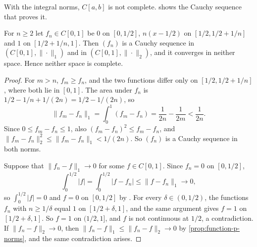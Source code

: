 With the integral norms, $C[a,b]$ is not complete.  shows the Cauchy sequence that proves it.

\begin{figure}
\end{figure}

\begin{proposition}
\label{prop:c-l1-incomplete}
For $n\ge2$ let $f_n\in C[0,1]$ be $0$ on $[0,1/2]$, $n(x-1/2)$ on $[1/2,1/2+1/n]$ and $1$ on $[1/2+1/n,1]$. Then $(f_n)$ is a Cauchy sequence in $(C[0,1],\|\cdot\|_1)$ and in $(C[0,1],\|\cdot\|_2)$, and it converges in neither space. Hence neither space is complete.
\end{proposition}

\begin{proof}
For $m>n$, $f_m\ge f_n$, and the two functions differ only on $[1/2,1/2+1/n]$, where both lie in $[0,1]$. The area under $f_n$ is $1/2-1/n+1/(2n)=1/2-1/(2n)$, so
\[
\|f_m-f_n\|_1=\int_0^1(f_m-f_n)=\frac1{2n}-\frac1{2m}<\frac1{2n} .
\]
Since $0\le f_m-f_n\le1$, also $(f_m-f_n)^2\le f_m-f_n$, and $\|f_m-f_n\|_2^2\le\|f_m-f_n\|_1<1/(2n)$. So $(f_n)$ is a Cauchy sequence in both norms.

Suppose that $\|f_n-f\|_1\to0$ for some $f\in C[0,1]$. Since $f_n=0$ on $[0,1/2]$,
\[
\int_0^{1/2}|f|=\int_0^{1/2}|f-f_n|\le\|f-f_n\|_1\to0 ,
\]
so $\int_0^{1/2}|f|=0$ and $f=0$ on $[0,1/2]$ by . For every $\delta\in(0,1/2)$, the functions $f_n$ with $n\ge1/\delta$ equal $1$ on $[1/2+\delta,1]$, and the same argument gives $f=1$ on $[1/2+\delta,1]$. So $f=1$ on $(1/2,1]$, and $f$ is not continuous at $1/2$, a contradiction. If $\|f_n-f\|_2\to0$, then $\|f_n-f\|_1\le\|f_n-f\|_2\to0$ by \cref{prop:function-p-norms}, and the same contradiction arises.
\end{proof}

